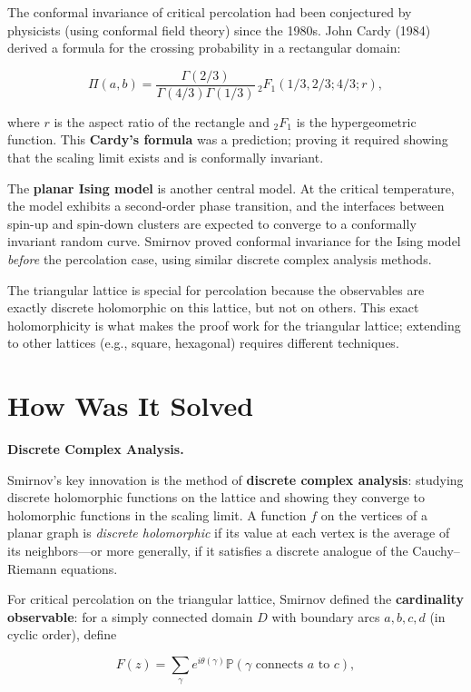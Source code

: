 The conformal invariance of critical percolation had been conjectured by physicists (using conformal field theory) since the 1980s. John Cardy (1984) derived a formula for the crossing probability in a rectangular domain:

\[
\Pi(a,b) = \frac{\Gamma(2/3)}{\Gamma(4/3)\Gamma(1/3)} \, {}_2F_1(1/3, 2/3; 4/3; r),
\]

where $r$ is the aspect ratio of the rectangle and ${}_2F_1$ is the hypergeometric function. This \textbf{Cardy's formula} was a prediction; proving it required showing that the scaling limit exists and is conformally invariant.

The \textbf{planar Ising model} is another central model. At the critical temperature, the model exhibits a second-order phase transition, and the interfaces between spin-up and spin-down clusters are expected to converge to a conformally invariant random curve. Smirnov proved conformal invariance for the Ising model \emph{before} the percolation case, using similar discrete complex analysis methods.

The triangular lattice is special for percolation because the observables are exactly discrete holomorphic on this lattice, but not on others. This exact holomorphicity is what makes the proof work for the triangular lattice; extending to other lattices (e.g., square, hexagonal) requires different techniques.

\section{How Was It Solved}\label{ch2010stanislavsmirnov:how-was-it-solved}

\textbf{Discrete Complex Analysis.}

Smirnov's key innovation is the method of \textbf{discrete complex analysis}: studying discrete holomorphic functions on the lattice and showing they converge to holomorphic functions in the scaling limit. A function $f$ on the vertices of a planar graph is \emph{discrete holomorphic} if its value at each vertex is the average of its neighbors---or more generally, if it satisfies a discrete analogue of the Cauchy--Riemann equations.

For critical percolation on the triangular lattice, Smirnov defined the \textbf{cardinality observable}: for a simply connected domain $D$ with boundary arcs $a, b, c, d$ (in cyclic order), define

\[
F(z) = \sum_{\gamma} e^{i \theta(\gamma)} \mathbb{P}(\gamma \text{ connects } a \text{ to } c),
\]

